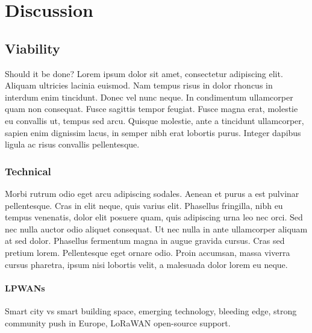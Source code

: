 \chapter{Discussion} %

\label{Chapter6}


\section{Viability}

Should it be done? Lorem ipsum dolor sit amet, consectetur adipiscing elit. Aliquam ultricies lacinia euismod. Nam tempus risus in dolor rhoncus in interdum enim tincidunt. Donec vel nunc neque. In condimentum ullamcorper quam non consequat. Fusce sagittis tempor feugiat. Fusce magna erat, molestie eu convallis ut, tempus sed arcu. Quisque molestie, ante a tincidunt ullamcorper, sapien enim dignissim lacus, in semper nibh erat lobortis purus. Integer dapibus ligula ac risus convallis pellentesque.


\subsection{Technical}

Morbi rutrum odio eget arcu adipiscing sodales. Aenean et purus a est pulvinar pellentesque. Cras in elit neque, quis varius elit. Phasellus fringilla, nibh eu tempus venenatis, dolor elit posuere quam, quis adipiscing urna leo nec orci. Sed nec nulla auctor odio aliquet consequat. Ut nec nulla in ante ullamcorper aliquam at sed dolor. Phasellus fermentum magna in augue gravida cursus. Cras sed pretium lorem. Pellentesque eget ornare odio. Proin accumsan, massa viverra cursus pharetra, ipsum nisi lobortis velit, a malesuada dolor lorem eu neque.


\subsubsection{LPWANs}
Smart city vs smart building space, emerging technology, bleeding edge, strong community push in Europe, LoRaWAN open-source support.

